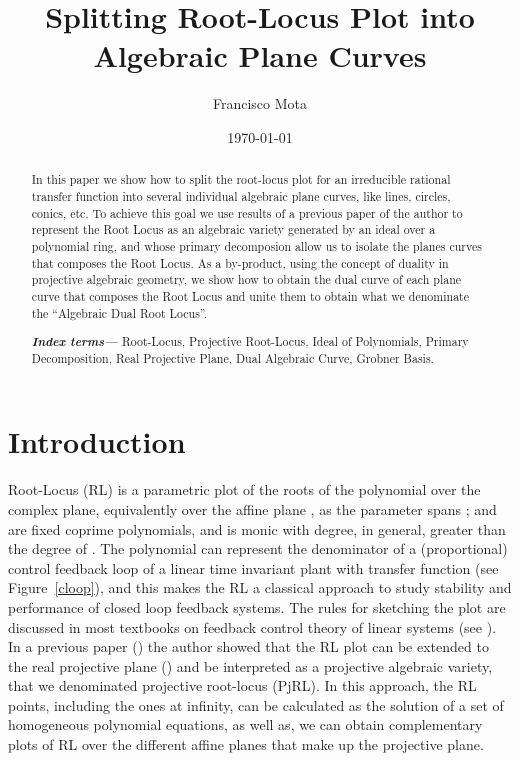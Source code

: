 \documentclass{article}
\author{Francisco Mota}
\affil{Departamento de Engenharia de Computa\c c\~ao e Automa\c c\~ao\\
Universidade Federal do Rio Grande do Norte -- Brasil\\
e-mail:mota@dca.ufrn.br}
\date{\today}
\title{Splitting Root-Locus Plot into Algebraic Plane Curves}
\providecommand{\keywords}[1]{\textbf{\textit{Index terms---}} #1}
\begin{document}
\maketitle

  
  
 
\begin{abstract}
In this paper we show how to split the root-locus plot for an irreducible rational transfer function
into several individual algebraic plane curves, like lines, circles, conics, etc. To achieve this goal we
use results of a previous paper of the author to represent the Root Locus as an algebraic 
variety generated by an ideal
over a polynomial ring, and whose primary decomposion allow us to isolate the planes curves that 
composes the Root Locus. As a by-product, using the concept of duality in projective algebraic geometry,
we show how to obtain the dual curve of each plane curve that composes the Root Locus and 
unite them to obtain what we denominate the ``Algebraic Dual Root Locus''.

\keywords{Root-Locus, Projective Root-Locus, Ideal of Polynomials, Primary Decomposition, 
Real Projective Plane, Dual Algebraic Curve, Grobner Basis.}


\end{abstract}

\section{Introduction}

Root-Locus (RL) is a  parametric plot of the roots of the polynomial
  over the complex plane, equivalently over the affine plane ,
as the parameter  spans ;  and 
are fixed coprime polynomials, and  is monic with degree, in general, greater
than the degree of . The polynomial  can represent the denominator of a (proportional) control
feedback loop of a  linear time invariant plant  with transfer function  (see Figure~\ref{cloop}), 
and this makes  the RL a classical approach to study stability and performance of 
closed loop feedback systems. The rules for sketching the plot are discussed in most textbooks on 
feedback control theory of linear systems (see \cite{dh}).
In a previous paper (\cite{pjrl}) the author showed that the RL plot can be extended 
to the  real projective plane () and be interpreted as a projective algebraic 
variety, that we denominated projective root-locus (PjRL). 
In this approach, the RL points, including the ones at infinity, 
can be calculated as the solution of a set of homogeneous polynomial equations, 
as well as, we can obtain complementary 
plots of RL over the different affine planes that make up the projective plane.
\end{document}
